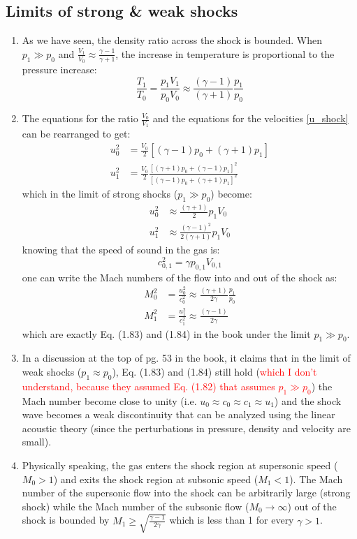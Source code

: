 ﻿\documentclass[11pt]{article}
\begin{document}
\subsection{Limits of strong \& weak shocks}
\begin{enumerate}
  \item As we have seen, the density ratio across the shock is bounded. When $p_1 \gg p_0$ and $\frac{V_1}{V_0} \approx \frac{\gamma - 1}{\gamma + 1}$, the increase in temperature is proportional to the pressure increase:
  \begin{equation}
    \frac{T_1}{T_0} = \frac{p_1 V_1}{p_0 V_0} \approx \frac{(\gamma - 1)}{(\gamma + 1)} \frac{p_1}{p_0}
  \end{equation} 
  \item The equations for the ratio $\frac{V_0}{V_1}$ and the equations for the velocities \ref{u_shock} can be rearranged to get:
  \begin{align}
    u_0^2 &= \frac{V_0}{2} \left[(\gamma - 1)p_0 + (\gamma + 1)p_1 \right] \\
    u_1^2 &= \frac{V_0}{2} \frac{\left[(\gamma + 1)p_0 + (\gamma - 1)p_1 \right]^2}{\left[ (\gamma - 1)p_0 + (\gamma + 1) p_1 \right]^2}
  \end{align}
  which in the limit of strong shocks ($p_1 \gg p_0$) become:
  \begin{align}
    u_0^2 &\approx \frac{(\gamma + 1)}{2} p_1 V_0 \\
    u_1^2 &\approx \frac{(\gamma - 1)^2}{2(\gamma + 1)} p_1 V_0
  \end{align}
  knowing that the speed of sound in the gas is:
  \begin{equation}
    c_{0,1}^2 = \gamma p_{0,1} V_{0,1}
  \end{equation}
  one can write the Mach numbers of the flow into and out of the shock as:
  \begin{align}
    M_0^2 &= \frac{u_0^2}{c_0^2} \approx \frac{(\gamma + 1)}{2\gamma} \frac{p_1}{p_0} \\
    M_1^2 &= \frac{u_1^2}{c_1^2} \approx \frac{(\gamma - 1)}{2\gamma}
  \end{align}
  which are exactly Eq. (1.83) and (1.84) in the book under the limit $p_1 \gg p_0$.\
  \item In a discussion at the top of pg. 53 in the book, it claims that in the limit of weak shocks ($p_1 \approx p_0$), Eq. (1.83) and (1.84) still hold (\textcolor{red}{which I don't understand, because they assumed Eq. (1.82) that assumes $p_1 \gg p_0$}) the Mach number become close to unity (i.e. $u_0 \approx c_0 \approx c_1 \approx u_1$) and the shock wave becomes a weak discontinuity that can be analyzed using the linear acoustic theory (since the perturbations in pressure, density and velocity are small).
  \item Physically speaking, the gas enters the shock region at supersonic speed ($M_0 > 1$) and exits the shock region at subsonic speed ($M_1 < 1$). The Mach number of the supersonic flow into the shock can be arbitrarily large (strong shock) while the Mach number of the subsonic flow ($M_0 \to \infty$) out of the shock is bounded by $M_1 \geq \sqrt{\frac{\gamma - 1}{2\gamma}}$ which is less than 1 for every $\gamma > 1$.
\end{enumerate}
\end{document}
